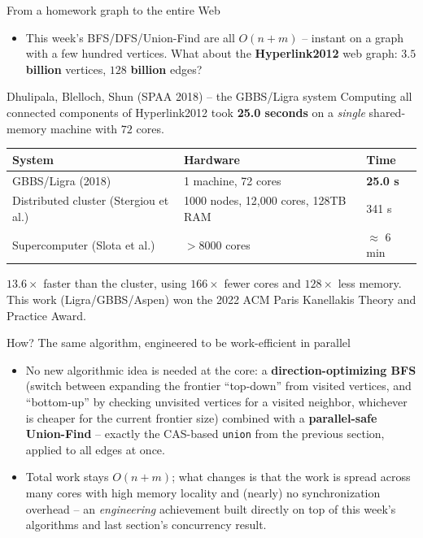 \documentclass[11pt,aspectratio=169]{beamer}
\begin{document}
\begin{frame}{From a homework graph to the entire Web}
  \begin{itemize}
    \item This week's BFS/DFS/Union-Find are all $O(n+m)$ -- instant on a graph with a
    few hundred vertices. What about the \textbf{Hyperlink2012} web graph: $3.5$
    \textbf{billion} vertices, $128$ \textbf{billion} edges?
  \end{itemize}
  \begin{block}{Dhulipala, Blelloch, Shun (SPAA 2018) -- the GBBS/Ligra system}
    Computing all connected components of Hyperlink2012 took \textbf{25.0 seconds}
    on a \emph{single} shared-memory machine with $72$ cores.
  \end{block}
  \begin{center}
  \begin{tabular}{@{}lll@{}}
    \toprule
    System & Hardware & Time \\
    \midrule
    GBBS/Ligra (2018) & 1 machine, 72 cores & \textbf{25.0 s} \\
    Distributed cluster (Stergiou et al.) & 1000 nodes, 12{,}000 cores, 128TB RAM & 341 s \\
    Supercomputer (Slota et al.) & $>8000$ cores & $\approx$ 6 min \\
    \bottomrule
  \end{tabular}
  \end{center}
  $13.6\times$ faster than the cluster, using $166\times$ fewer cores and $128\times$
  less memory. This work (Ligra/GBBS/Aspen) won the 2022 ACM Paris Kanellakis Theory
  and Practice Award.
\end{frame}

\begin{frame}{How? The same algorithm, engineered to be work-efficient in parallel}
  \begin{itemize}
    \item No new algorithmic idea is needed at the core: a \textbf{direction-optimizing
    BFS} (switch between expanding the frontier ``top-down'' from visited vertices, and
    ``bottom-up'' by checking unvisited vertices for a visited neighbor, whichever is
    cheaper for the current frontier size) combined with a \textbf{parallel-safe
    Union-Find} -- exactly the CAS-based \texttt{union} from the previous section,
    applied to all edges at once.
    \item Total work stays $O(n+m)$; what changes is that the work is spread across
    many cores with high memory locality and (nearly) no synchronization overhead --
    an \emph{engineering} achievement built directly on top of this week's algorithms
    and last section's concurrency result.
  \end{itemize}
\end{frame}
\end{document}
